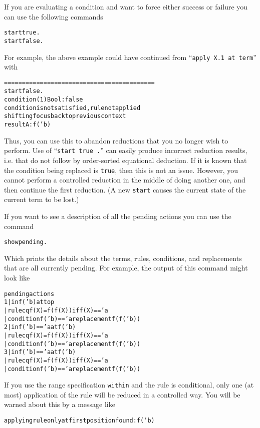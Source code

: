If you are evaluating a condition and want to force either success
or failure you can use the following commands
\begin{alltt}
        start true .
        start false .
\end{alltt}
For example, the above example could have continued from ``{\tt apply
  X.1 at term}'' with
\begin{alltt}
        ==========================================
        start false .
        condition(1) Bool: false
        condition is not satisfied, rule not applied
        shifting focus back to previous context
        result A: f('b)
\end{alltt}
Thus, you can use this to abandon reductions that you no longer wish
to perform.  Use of ``{\tt start true .}'' can easily produce
incorrect reduction results, i.e. that do not follow by order-sorted
equational deduction.  If it is known that the condition being
replaced is {\tt true}, then this is not an issue.  However, you
cannot perform a controlled reduction in the middle of doing another
one, and then continue the first reduction.  (A new {\tt start} causes
the current state of the current term to be lost.)

If you want to see a description of all the pending actions you can
use the command
\begin{alltt}
        show pending .
\end{alltt}
Which prints the details about the terms, rules, conditions, and
replacements that are all currently pending.  For example, the output
of this command might look like
\begin{alltt}
        pending actions
          1| in f('b)  at top
           | rule cq f(X) = f(f(X)) if f(X) == 'a
           | condition f('b) == 'a  replacement f(f('b))
             2| in f('b) == 'a  at f('b)
              | rule cq f(X) = f(f(X)) if f(X) == 'a
              | condition f('b) == 'a  replacement f(f('b))
                3| in f('b) == 'a  at f('b)
                 | rule cq f(X) = f(f(X)) if f(X) == 'a
                 | condition f('b) == 'a  replacement f(f('b))
\end{alltt}

If you use the range specification {\tt within} and the rule is
conditional, only one (at most) application of the rule will be
reduced in a controlled way.  You will be warned about this by a
message like
\begin{alltt}
        applying rule only at first position found: f('b)
\end{alltt}

